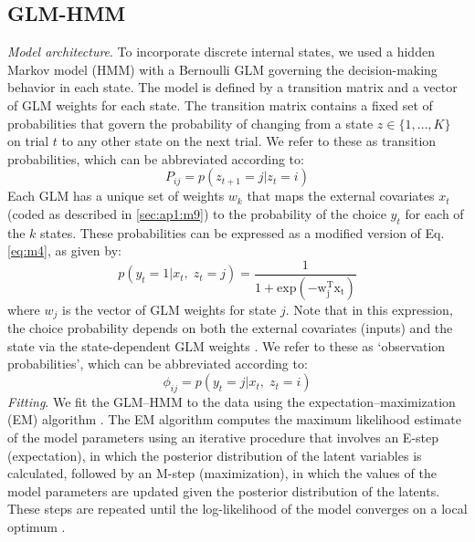 \subsection{GLM-HMM}
\label{sec:ap1:m10}
\textit{Model architecture}. To incorporate discrete internal states, we used a hidden Markov model (HMM) with a Bernoulli GLM governing the decision-making behavior in each state. The model is defined by a transition matrix and a vector of GLM weights for each state. The transition matrix contains a fixed set of probabilities that govern the probability of changing from a state $z \in \{ 1, \ldots ,K\}$ on trial $t$ to any other state on the next trial. We refer to these as transition probabilities, which can be abbreviated according to: 
\begin{equation}
\label{eq:m6}
    P_{ij} = p\left( {z_{t + 1} = j|z_t = i} \right)
\end{equation}
Each GLM has a unique set of weights $w_k$ that maps the external covariates $x_t$ (coded as described in \ref{sec:ap1:m9}) to the probability of the choice $y_t$ for each of the $k$ states. These probabilities can be expressed as a modified version of Eq. \ref{eq:m4}, as given by:
\begin{equation}
\label{eq:m7}
    p\left( {y_t = 1|x_t,\;z_t = j} \right) = \frac{1}{{1 + {{{\mathrm{exp}}}}\left( { - {{{\mathrm{w}}}}_{{{\mathrm{j}}}}^{{{\mathrm{T}}}}{{{\mathrm{x}}}}_{{{\mathrm{t}}}}} \right)}}
\end{equation}
where $w_j$ is the vector of GLM weights for state $j$. Note that in this expression, the choice probability depends on both the external covariates (inputs) and the state via the state-dependent GLM weights \cite{bengio_input_1994,escola_hidden_2011,calhoun_unsupervised_2019}. We refer to these as ‘observation probabilities’, which can be abbreviated according to: 
\begin{equation}
\label{eq:m8}
    \phi _{ij} = p\left( {y_t = j|x_t,\;z_t = i} \right)
\end{equation}
\textit{Fitting}. We fit the GLM–HMM to the data using the expectation–maximization (EM) algorithm \cite{escola_hidden_2011}. The EM algorithm computes the maximum likelihood estimate of the model parameters using an iterative procedure that involves an E-step (expectation), in which the posterior distribution of the latent variables is calculated, followed by an M-step (maximization), in which the values of the model parameters are updated given the posterior distribution of the latents. These steps are repeated until the log-likelihood of the model converges on a local optimum \cite{bishop_pattern_2006}. \\
